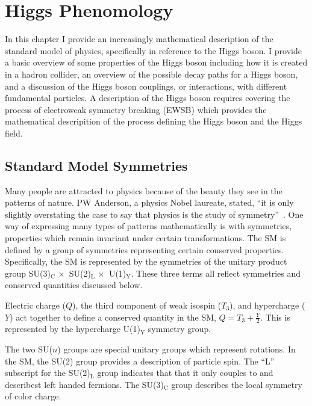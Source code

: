 \chapter{Higgs Phenomology}
\label{sec:pheno}


In this chapter I provide an increasingly mathematical description of the standard model
of physics, specifically in reference to the Higgs boson. I provide a basic overview of some 
properties of the Higgs boson including how it is created in a hadron collider, an overview
of the possible decay paths for a Higgs boson, and a discussion of the Higgs boson
couplings, or interactions, with different fundamental particles. A description of the
Higgs boson requires covering the process of electroweak symmetry breaking (EWSB) which
provides the mathematical descripition of the process defining the Higgs boson and the
Higgs field.

\section{Standard Model Symmetries}
Many people are attracted to physics because of the beauty they see in the patterns of nature.
PW Anderson, a physics Nobel laureate, stated, ``it is only slightly overstating the case 
to say that physics is the study of symmetry''~\cite{pw_anderson:1972}.
One way of expressing many types of patterns mathematically is with symmetries, properties which 
remain invariant under certain transformations. The SM is defined by a group of symmetries
representing certain conserved properties. Specifically, the SM is represented by  the
symmetries of the unitary product group SU(3)$_{\text{C}} \,\times \,$ SU(2)$_{\text{L}} \, \times\,$ U(1)$_{\text{Y}}$.
These three terms all reflect symmetries and conserved quantities discussed below.

Electric charge ($Q$), the third component of weak isospin ($T_{3}$), and hypercharge ($Y$) act together to define a conserved 
quantity in the SM, $Q = T_{3} + \frac{Y}{2}$. This is represented by the
hypercharge U(1)$_{\text{Y}}$ symmetry group.

The two SU($n$) groups are special unitary groups which represent rotations.
In the SM, the SU(2) group provides a description of particle spin.
The ``L'' subscript for the SU(2)$_{\text{L}}$ group indicates that that it only couples to
and describest left handed fermions.
The SU(3)$_{\text{C}}$ group describes the local symmetry of color charge.


